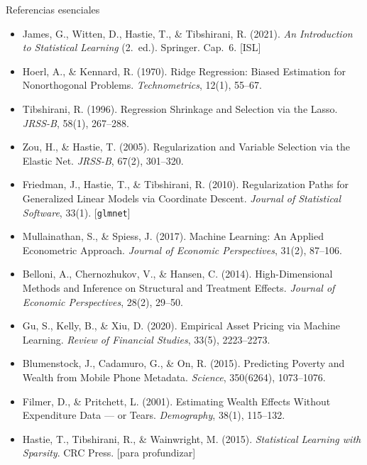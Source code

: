 \documentclass{beamer}
\newcommand{\1}{\mathbb{I}}
\begin{document}
\begin{frame}{Referencias esenciales}
\scriptsize
\begin{itemize}\itemsep1pt
  \item James, G., Witten, D., Hastie, T., \& Tibshirani, R. (2021). \emph{An Introduction to Statistical Learning} (2.\ ed.). Springer. Cap.\ 6. [ISL]
  \item Hoerl, A., \& Kennard, R. (1970). Ridge Regression: Biased Estimation for Nonorthogonal Problems. \emph{Technometrics}, 12(1), 55--67.
  \item Tibshirani, R. (1996). Regression Shrinkage and Selection via the Lasso. \emph{JRSS-B}, 58(1), 267--288.
  \item Zou, H., \& Hastie, T. (2005). Regularization and Variable Selection via the Elastic Net. \emph{JRSS-B}, 67(2), 301--320.
  \item Friedman, J., Hastie, T., \& Tibshirani, R. (2010). Regularization Paths for Generalized Linear Models via Coordinate Descent. \emph{Journal of Statistical Software}, 33(1). [\texttt{glmnet}]
  \item Mullainathan, S., \& Spiess, J. (2017). Machine Learning: An Applied Econometric Approach. \emph{Journal of Economic Perspectives}, 31(2), 87--106.
  \item Belloni, A., Chernozhukov, V., \& Hansen, C. (2014). High-Dimensional Methods and Inference on Structural and Treatment Effects. \emph{Journal of Economic Perspectives}, 28(2), 29--50.
  \item Gu, S., Kelly, B., \& Xiu, D. (2020). Empirical Asset Pricing via Machine Learning. \emph{Review of Financial Studies}, 33(5), 2223--2273.
  \item Blumenstock, J., Cadamuro, G., \& On, R. (2015). Predicting Poverty and Wealth from Mobile Phone Metadata. \emph{Science}, 350(6264), 1073--1076.
  \item Filmer, D., \& Pritchett, L. (2001). Estimating Wealth Effects Without Expenditure Data --- or Tears. \emph{Demography}, 38(1), 115--132.
  \item Hastie, T., Tibshirani, R., \& Wainwright, M. (2015). \emph{Statistical Learning with Sparsity}. CRC Press. [para profundizar]
\end{itemize}
\normalsize
\end{frame}


\appendix
\end{document}
